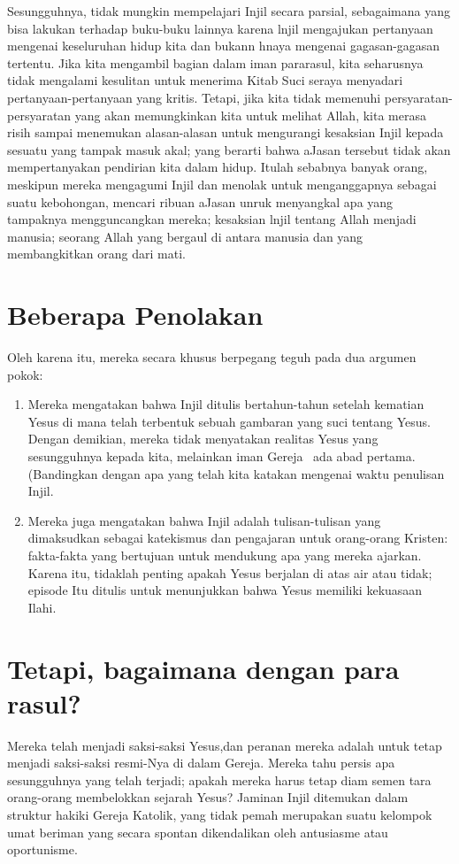 Sesungguhnya, tidak mungkin mempelajari Injil secara parsial, sebagaimana yang bisa lakukan terhadap buku-buku lainnya karena lnjil mengajukan pertanyaan mengenai keseluruhan hidup kita dan bukann hnaya mengenai gagasan-gagasan tertentu. Jika kita mengambil bagian dalam iman pararasul, kita seharusnya tidak mengalami kesulitan untuk menerima Kitab Suci seraya menyadari pertanyaan-pertanyaan yang kritis. Tetapi, jika kita tidak memenuhi persyaratan-persyaratan yang akan memungkinkan kita untuk melihat Allah, kita merasa risih sampai menemukan alasan-alasan untuk mengurangi kesaksian Injil kepada sesuatu yang tampak masuk akal; yang berarti bahwa aJasan tersebut tidak akan mempertanyakan pendirian kita dalam hidup. Itulah sebabnya banyak orang, meskipun mereka mengagumi Injil dan menolak untuk menganggapnya sebagai suatu kebohongan, mencari ribuan aJasan unruk menyangkal apa yang tampaknya mengguncangkan mereka; kesaksian lnjil tentang Allah menjadi manusia; seorang Allah yang bergaul di antara manusia dan yang membangkitkan orang dari mati.

\section*{Beberapa Penolakan}
Oleh karena itu, mereka secara khusus berpegang teguh pada dua argumen pokok:
\begin{enumerate}
\item Mereka mengatakan bahwa Injil ditulis bertahun-tahun setelah kematian Yesus di mana telah terbentuk sebuah gambaran yang suci tentang Yesus. Dengan demikian, mereka tidak menyatakan realitas Yesus yang sesungguhnya kepada kita, melainkan iman Gereja ~ada abad pertama. (Bandingkan dengan apa yang telah kita katakan mengenai waktu penulisan Injil.
\item Mereka juga mengatakan bahwa Injil adalah tulisan-tulisan yang dimaksudkan sebagai katekismus dan pengajaran untuk orang-orang Kristen: fakta-fakta yang bertujuan untuk mendukung apa yang mereka ajarkan. Karena itu, tidaklah penting apakah Yesus berjalan di atas air atau tidak; episode Itu ditulis untuk menunjukkan bahwa Yesus memiliki kekuasaan Ilahi.
\end{enumerate}

\section*{Tetapi, bagaimana dengan para rasul?}
Mereka telah menjadi saksi-saksi Yesus,dan peranan mereka adalah untuk tetap menjadi saksi-saksi resmi-Nya di dalam Gereja. Mereka tahu persis apa sesungguhnya yang telah terjadi; apakah mereka harus tetap diam semen tara orang-orang membelokkan sejarah Yesus? Jaminan Injil ditemukan dalam struktur hakiki Gereja Katolik, yang tidak pemah merupakan suatu kelompok umat beriman yang secara spontan dikendalikan oleh antusiasme atau oportunisme.

